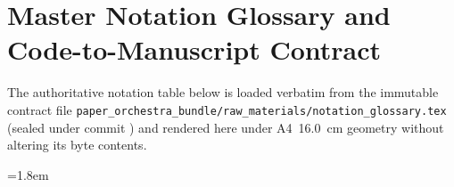 \chapter{Master Notation Glossary and Code-to-Manuscript Contract}
\label{app:notation}

{\sloppy
The authoritative notation table below is loaded verbatim from the immutable contract file
\texttt{paper\_\allowbreak orchestra\_\allowbreak bundle/\allowbreak raw\_\allowbreak materials/\allowbreak notation\_\allowbreak glossary.tex}
(sealed under commit \FrozenGitCommit{}) and rendered here under A4~\SI{16.0}{\centi\meter}
geometry without altering its byte contents.
\par}

\begingroup
\singlespacing
\scriptsize
\emergencystretch=1.8em
\let\NOTATIONMACROSONLY\undefined

\endgroup
